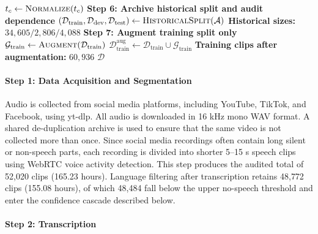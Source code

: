 \documentclass[journal]{IEEEtran}
\begin{document}
\begin{algorithm}[t]
\begin{algorithmic}[1]
    \State $t_c \gets \textsc{Normalize}(t_c)$ 
\EndFor
\vspace{0.2em}
\Statex \textbf{Step 6: Archive historical split and audit dependence}
\State $(\mathcal{D}_{\text{train}},\mathcal{D}_{\text{dev}},\mathcal{D}_{\text{test}}) \gets \textsc{HistoricalSplit}(\mathcal{A})$ 
\State \textbf{Historical sizes:} $34{,}605/2{,}806/4{,}088$ 
\vspace{0.2em}
\Statex \textbf{Step 7: Augment training split only}
\State $\mathcal{G}_{\text{train}} \gets \textsc{Augment}(\mathcal{D}_{\text{train}})$ 
\State $\mathcal{D}^{\text{aug}}_{\text{train}} \gets \mathcal{D}_{\text{train}} \cup \mathcal{G}_{\text{train}}$
\State \textbf{Training clips after augmentation:} $60{,}936$
\vspace{0.2em}
\State \Return $\mathcal{D}$ 
\end{algorithmic}
\end{algorithm}





\paragraph*{Step 1: Data Acquisition and Segmentation}

Audio is collected from social media platforms, including YouTube, TikTok, and Facebook, using yt-dlp. All audio is downloaded in 16 kHz mono WAV format. A shared de-duplication archive is used to ensure that the same video is not collected more than once. Since social media recordings often contain long silent or non-speech parts, each recording is divided into shorter 5--15 s speech clips using WebRTC voice activity detection. This step produces the audited total of 52{,}020 clips (165.23 hours). Language filtering after transcription retains 48{,}772 clips (155.08 hours), of which 48{,}484 fall below the upper no-speech threshold and enter the confidence cascade described below.

\paragraph*{Step 2: Transcription}
\end{document}
